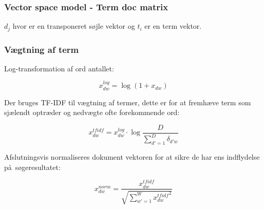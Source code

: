 \documentclass[xcolor=table]{beamer}
\begin{document}
\begin{frame}

  \frametitle{Vector space model - Term doc matrix}

  \begin{center}
  \end{center}

  $d_j$ hvor er en transponeret s\o jle vektor og $t_i$ er en term vektor.

\end{frame}

\begin{frame}

  \frametitle{V\ae gtning af term}

  Log-transformation af ord antallet:

  \[
  x_{dw}^{log} = \log{(1 + x_{dw})}
  \]

  Der bruges TF-IDF til v\ae gtning af termer, dette er for at fremh\ae ve term som sj\ae lendt optr\ae der og nedv\ae gte ofte forekommende ord:

  \[
  x_{dw}^{tfidf} = x_{dw}^{log} \cdot \log{\frac{D}{\sum_{d\prime = 1}^{D}\delta_{d\prime w}}}
  \]

  Afslutningsvis normaliseres dokument vektoren for at sikre de har ens indflydelse p\aa\ s\o geresultatet:

  \[
  x_{dw}^{norm} = \frac{x_{dw}^{tfidf}}{\sqrt{\sum_{w\prime = 1}^{W} {x_{dw}^{tfidf}}^{2}}}
  \]

\end{frame}
\end{document}
